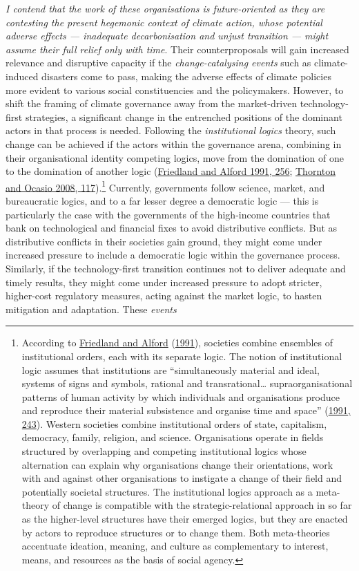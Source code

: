 \documentclass[a4paper, nobind]{templates/ociamthesis}
\begin{document}
\emph{I contend that the work of these organisations is future-oriented as they are contesting the present hegemonic context of climate action, whose potential adverse effects --- inadequate decarbonisation and unjust transition --- might assume their full relief only with time}. Their counterproposals will gain increased relevance and disruptive capacity if the \emph{change-catalysing events} such as climate-induced disasters come to pass, making the adverse effects of climate policies more evident to various social constituencies and the policymakers. However, to shift the framing of climate governance away from the market-driven technology-first strategies, a significant change in the entrenched positions of the dominant actors in that process is needed. Following the \emph{institutional logics} theory, such change can be achieved if the actors within the governance arena, combining in their organisational identity competing logics, move from the domination of one to the domination of another logic (\protect\hyperlink{ref-friedland_bringing_1991}{Friedland and Alford 1991, 256}; \protect\hyperlink{ref-thornton_institutional_2008}{Thornton and Ocasio 2008, 117}).\footnote{According to \protect\hyperlink{ref-friedland_bringing_1991}{Friedland and Alford} (\protect\hyperlink{ref-friedland_bringing_1991}{1991}), societies combine ensembles of institutional orders, each with its separate logic. The notion of institutional logic assumes that institutions are ``simultaneously material and ideal, systems of signs and symbols, rational and transrational\ldots{} supraorganisational patterns of human activity by which individuals and organisations produce and reproduce their material sub­sistence and organise time and space'' (\protect\hyperlink{ref-friedland_bringing_1991}{1991, 243}). Western societies combine institutional orders of state, capitalism, democracy, family, religion, and science. Organisations operate in fields structured by overlapping and competing institutional logics whose alternation can explain why organisations change their orientations, work with and against other organisations to instigate a change of their field and potentially societal structures. The institutional logics approach as a meta-theory of change is compatible with the strategic-relational approach in so far as the higher-level structures have their emerged logics, but they are enacted by actors to reproduce structures or to change them. Both meta-theories accentuate ideation, meaning, and culture as complementary to interest, means, and resources as the basis of social agency.} Currently, governments follow science, market, and bureaucratic logics, and to a far lesser degree a democratic logic --- this is particularly the case with the governments of the high-income countries that bank on technological and financial fixes to avoid distributive conflicts. But as distributive conflicts in their societies gain ground, they might come under increased pressure to include a democratic logic within the governance process. Similarly, if the technology-first transition continues not to deliver adequate and timely results, they might come under increased pressure to adopt stricter, higher-cost regulatory measures, acting against the market logic, to hasten mitigation and adaptation. These \emph{events} 
\end{document}
